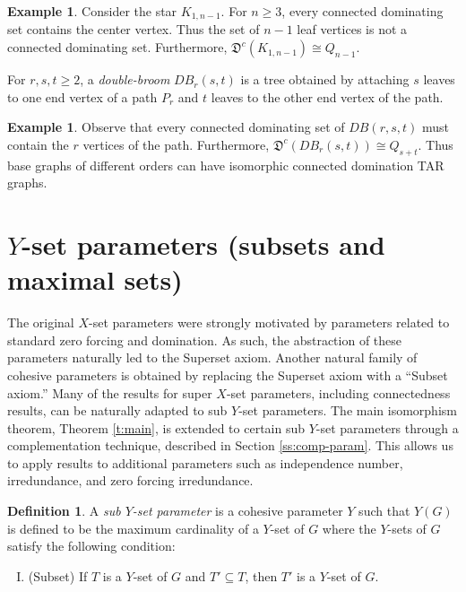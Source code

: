 \documentclass{article}
\numberwithin{figure}{section}
\numberwithin{table}{section}
\numberwithin{equation}{section}
\theoremstyle{definition}
\theoremstyle{definition}
\newtheorem{defn}[thm]{Definition}
\theoremstyle{definition}
\newtheorem{ex}[thm]{Example}
\newcommand{\ben}{\begin{enumerate}}
\newcommand{\een}{\end{enumerate}}
\newcommand{\dctar}{\mathfrak{D}^c}%
\begin{document}
{\begin{ex}\label{ex:conndom1}  Consider the star $K_{1,n-1}$.  For $n\ge 3$,  every connected dominating set contains the center vertex. 
Thus the set of $n-1$ leaf vertices is not a connected dominating set.  Furthermore,  $\dctar(K_{1,n-1})\cong Q_{n-1}$.  %
\end{ex}

For $r,s,t\ge 2$, a \emph{double-broom} $DB_r(s, t)$ is a    tree obtained by attaching $s$ leaves to one end vertex of a
path $P_r$ and $t$ leaves to the other end vertex of the path.

\begin{ex}\label{ex:double-broom}    Observe that  every connected dominating set of $DB(r,s,t)$ must contain the $r$ vertices of the path. 
Furthermore,  $\dctar(DB_r(s,t))\cong Q_{s+t}$.  Thus base graphs of different orders can have isomorphic connected domination TAR graphs.
\end{ex}





\section{$Y$-set parameters (subsets and maximal sets)}\label{s:maxYparam}

The original $X$-set parameters were strongly motivated by parameters related to standard zero forcing  and domination. As such, the abstraction of these parameters naturally led to the Superset axiom. Another natural family of cohesive parameters is obtained by replacing the Superset axiom with a ``Subset axiom.'' 
Many of the results for super $X$-set parameters, including connectedness results, can be naturally adapted to sub $Y$-set parameters. The main isomorphism theorem, Theorem \ref{t:main},  is extended to certain sub $Y$-set parameters through  a complementation technique, described in Section \ref{ss:comp-param}.  This allows us to apply results to additional parameters such as independence number, irredundance, and zero forcing irredundance. 

\begin{defn}
 A \emph{sub $Y$-set 
parameter}  is a cohesive parameter $Y$ such that $Y(G)$ is defined to be the maximum cardinality of a $Y$-set of $G$  where   the $Y$-sets of $G$ satisfy the following condition:  
\ben[(I)]
\item (Subset) If $T$ is a $Y$-set of $G$ and $T'\subseteq T$, then $T'$ is a $Y$-set of $G$.
\een


\end{defn}}
\end{document}
